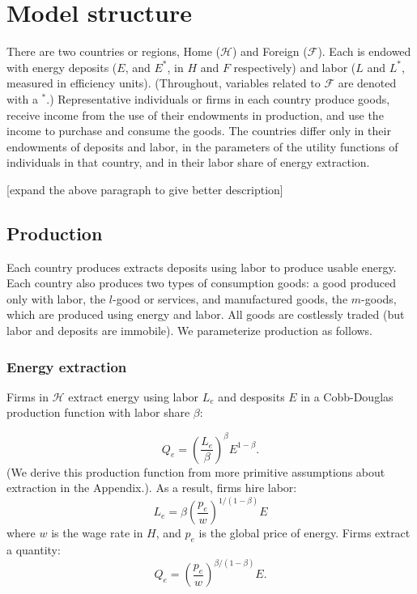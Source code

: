 \documentclass[notitlepage,12pt]{article}
\begin{document}
\section{Model structure}

There are two countries or regions, Home ($\mathcal{H}$) and Foreign ($%
\mathcal{F}$). Each is endowed with energy deposits ($E$, and $E^{\ast }$,
in $H$ and $F$ respectively) and labor ($L$ and $L^{\ast }$, measured in
efficiency units). (Throughout, variables related to $\mathcal{F}$ are
denoted with a $^{\ast }$.) Representative individuals or firms in each
country produce goods, receive income from the use of their endowments in
production, and use the income to purchase and consume the goods. The
countries differ only in their endowments of deposits and labor, in the
parameters of the utility functions of individuals in that country, and in
their labor share of energy extraction.

[expand the above paragraph to give better description]

\subsection{Production}

Each country produces extracts deposits using labor to produce usable
energy. Each country also produces two types of consumption goods: a good
produced only with labor, the $l$-good or services, and manufactured goods,
the $m$-goods, which are produced using energy and labor. All goods are
costlessly traded (but labor and deposits are immobile). We parameterize
production as follows.

\subsubsection{Energy extraction}

Firms in $\mathcal{H}$ extract energy using labor $L_{e}$ and desposits $E$
in a Cobb-Douglas production function with labor share $\beta $:

\begin{equation*}
Q_{e}=\left( \frac{L_{e}}{\beta }\right) ^{\beta }E^{1-\beta }.
\end{equation*}%
(We derive this production function from more primitive assumptions about
extraction in the Appendix.). As a result, firms hire labor:%
\begin{equation*}
L_{e}=\beta \left( \frac{p_{e}}{w}\right) ^{1/(1-\beta )}E
\end{equation*}%
where $w$ is the wage rate in $H$, and $p_{e}$ is the global price of
energy. Firms extract a quantity:%
\begin{equation*}
Q_{e}=\left( \frac{p_{e}}{w}\right) ^{\beta /(1-\beta )}E.
\end{equation*}
\end{document}
